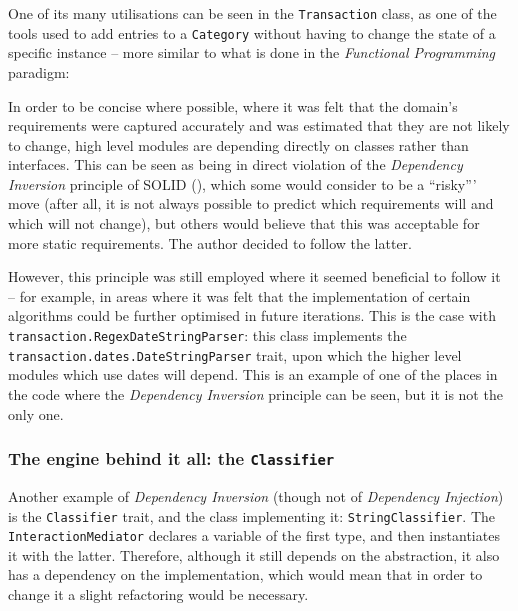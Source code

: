 One of its many utilisations can be seen in the \texttt{Transaction} class, as
one of the tools used to add entries to a \texttt{Category} without having to
change the state of a specific instance -- more similar to what is done in the
\emph{Functional Programming} paradigm:
{
  \small
  
}


In order to be concise where possible, where it was felt that the domain's
requirements were captured accurately and was estimated that they are not
likely to change, high level modules are depending directly on classes rather
than interfaces. This can be seen as being in direct violation of the
\emph{Dependency Inversion} principle of SOLID
(\cite[][]{martin1996dependency}), which some would consider to be a ``risky'''
move (after all, it is not always possible to predict which requirements will
and which will not change), but others would believe that this was acceptable
for more static requirements. The author decided to follow the latter.

\begin{sloppypar}
  However, this principle was still employed where it seemed beneficial to
  follow it -- for example, in areas where it was felt that the implementation
  of certain algorithms could be further optimised in future iterations. This
  is the case with \texttt{transaction.RegexDateStringParser}: this class
  implements the \texttt{transaction.dates.DateStringParser} trait, upon which
  the higher level modules which use dates will depend. This is an example of
  one of the places in the code where the \emph{Dependency Inversion} principle
  can be seen, but it is not the only one.
\end{sloppypar}


\subsubsection{The engine behind it all: the \texttt{Classifier}}

Another example of \emph{Dependency Inversion} (though not of \emph{Dependency
Injection}) is the \texttt{Classifier} trait, and the class implementing it:
\texttt{StringClassifier}. The \texttt{InteractionMediator} declares a variable
of the first type, and then instantiates it with the latter. Therefore,
although it still depends on the abstraction, it also has a dependency on the
implementation, which would mean that in order to change it a slight
refactoring would be necessary.

